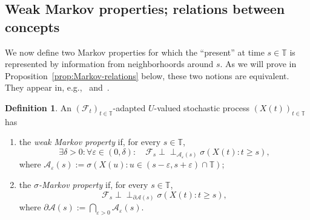 \documentclass[reqno]{amsart}
\numberwithin{equation}{section}
\newcommand{\bbT}{\mathbb{T}}
\newcommand{\cF}{\mathcal{F}}
\newcommand{\ind}{\perp\!\!\!\perp}
\theoremstyle{remark}
\theoremstyle{definition}
\newtheorem{definition}[lemma]{Definition}
\begin{document}
\subsection{Weak Markov properties; relations between concepts}
We now define two Markov properties for which
the ``present'' at time $s \in \bbT$ is represented by 
information from neighborhoords around $s$.
As we will prove in Proposition~\ref{prop:Markov-relations} below, these two notions are equivalent.
They appear in, e.g.,~\cite[p.~62]{Rozanov1982} and~\cite[Equation~(5.87), p.~115]{HidaHitsuda1993}.

\begin{definition}\label{def:weak-markov}
	An $(\cF_t)_{t\in\bbT}$-adapted $U$-valued
	stochastic process $(X(t))_{t\in\bbT}$ has
	\begin{enumerate}
		\item 
		the \emph{weak Markov property} if, for every $s \in \bbT$,
		\begin{equation}\label{eq:weak-markov-cond-ind}
			\exists \delta > 0 : \forall \varepsilon \in (0,\delta) : \quad  
			\cF_s \ind_{\mathscr A_\varepsilon(s)} \sigma(X(t) : t \ge s),
		\end{equation}
		where $\mathscr A_\varepsilon(s) := \sigma(X(u) : u \in  (s-\varepsilon, s + \varepsilon) \cap \bbT)$;
		\item the \emph{$\sigma$-Markov property} if, for every $s \in \bbT$,
		\begin{equation}\label{eq:sigma-markov-cond-ind}
			\cF_s \ind_{\partial \mathscr A(s)} \sigma(X(t) : t \ge s),
		\end{equation}
		where $\partial \mathscr A(s) := \bigcap_{\varepsilon > 0} \mathscr A_\varepsilon(s)$.
	\end{enumerate}
\end{definition}
\end{document}
